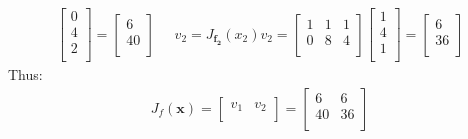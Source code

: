 \documentclass[12pt]{article}
\begin{document}
\begin{qsolve}
\begin{gather*}
\begin{bmatrix}
            0 \\
            4 \\
            2 \\
        \end{bmatrix}
        =
        \begin{bmatrix}
            6  \\
            40 \\
        \end{bmatrix}
        \; \; \; \; \;
        v_2 = J_{\mathbf{f_2}}(x_2) v_2 =
        \begin{bmatrix}
            1 & 1 & 1 \\
            0 & 8 & 4 \\
        \end{bmatrix}
        \begin{bmatrix}
            1 \\
            4 \\
            1 \\
        \end{bmatrix}
        =
        \begin{bmatrix}
            6  \\
            36 \\
        \end{bmatrix}
    \end{gather*}
    \splitqsolve
    Thus:
    \begin{gather*}
        J_f(\mathbf{x}) = \begin{bmatrix}
            v_{1} & v_{2} \\
        \end{bmatrix}
        = \begin{bmatrix}
            6  & 6  \\
            40 & 36 \\
        \end{bmatrix}
    \end{gather*}
\end{qsolve}
\end{document}
